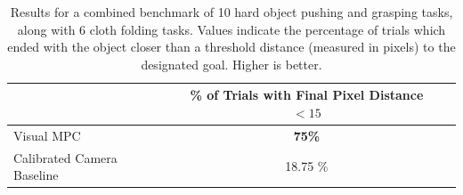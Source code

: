 \label{subsec:cloth_folding_data}
\begin{table}
\centering
{\footnotesize
\begin{tabular}{lcc}
	\toprule
         &  \thead{\% of Trials with \\ Final Pixel Distance $< 15$}   \\
         \midrule
  Visual MPC & \textbf{75\%} \\ 
  Calibrated Camera Baseline & 18.75 \% \\
  \bottomrule
\end{tabular}
}
\caption{Results for a combined benchmark of 10 hard object pushing and grasping tasks, along with 6 cloth folding tasks. Values indicate the percentage of trials which ended with the object closer than a threshold distance (measured in pixels) to the designated goal. Higher is better.} 
\label{table:cloth_folding}
\end{table}